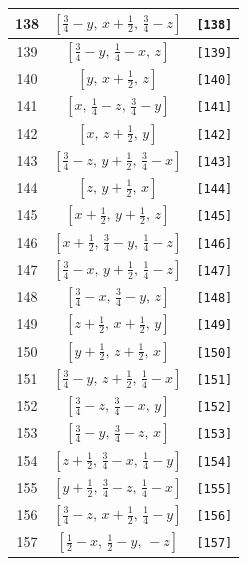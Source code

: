 \documentclass[fleqn,8pt]{jsarticle}
\begin{document}
\begin{longtable}{ccc}
138 & $\left[ \frac{3}{4} - y,\, x + \frac{1}{2},\, \frac{3}{4} - z \right]$ & {\tt [138]} \\ \hline
139 & $\left[ \frac{3}{4} - y,\, \frac{1}{4} - x,\, z \right]$ & {\tt [139]} \\ \hline
140 & $\left[ y,\, x + \frac{1}{2},\, z \right]$ & {\tt [140]} \\ \hline
141 & $\left[ x,\, \frac{1}{4} - z,\, \frac{3}{4} - y \right]$ & {\tt [141]} \\ \hline
142 & $\left[ x,\, z + \frac{1}{2},\, y \right]$ & {\tt [142]} \\ \hline
143 & $\left[ \frac{3}{4} - z,\, y + \frac{1}{2},\, \frac{3}{4} - x \right]$ & {\tt [143]} \\ \hline
144 & $\left[ z,\, y + \frac{1}{2},\, x \right]$ & {\tt [144]} \\ \hline
145 & $\left[ x + \frac{1}{2},\, y + \frac{1}{2},\, z \right]$ & {\tt [145]} \\ \hline
146 & $\left[ x + \frac{1}{2},\, \frac{3}{4} - y,\, \frac{1}{4} - z \right]$ & {\tt [146]} \\ \hline
147 & $\left[ \frac{3}{4} - x,\, y + \frac{1}{2},\, \frac{1}{4} - z \right]$ & {\tt [147]} \\ \hline
148 & $\left[ \frac{3}{4} - x,\, \frac{3}{4} - y,\, z \right]$ & {\tt [148]} \\ \hline
149 & $\left[ z + \frac{1}{2},\, x + \frac{1}{2},\, y \right]$ & {\tt [149]} \\ \hline
150 & $\left[ y + \frac{1}{2},\, z + \frac{1}{2},\, x \right]$ & {\tt [150]} \\ \hline
151 & $\left[ \frac{3}{4} - y,\, z + \frac{1}{2},\, \frac{1}{4} - x \right]$ & {\tt [151]} \\ \hline
152 & $\left[ \frac{3}{4} - z,\, \frac{3}{4} - x,\, y \right]$ & {\tt [152]} \\ \hline
153 & $\left[ \frac{3}{4} - y,\, \frac{3}{4} - z,\, x \right]$ & {\tt [153]} \\ \hline
154 & $\left[ z + \frac{1}{2},\, \frac{3}{4} - x,\, \frac{1}{4} - y \right]$ & {\tt [154]} \\ \hline
155 & $\left[ y + \frac{1}{2},\, \frac{3}{4} - z,\, \frac{1}{4} - x \right]$ & {\tt [155]} \\ \hline
156 & $\left[ \frac{3}{4} - z,\, x + \frac{1}{2},\, \frac{1}{4} - y \right]$ & {\tt [156]} \\ \hline
157 & $\left[ \frac{1}{2} - x,\, \frac{1}{2} - y,\, - z \right]$ & {\tt [157]} \\ \hline

\end{longtable}
\end{document}
